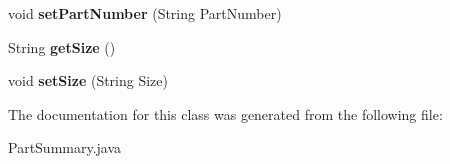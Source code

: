 \begin{DoxyCompactItemize}
\item 
void {\bfseries set\+Part\+Number} (String Part\+Number)\hypertarget{classorg_1_1jcs_1_1dss_1_1main_1_1PartSummary_a862ffbd749521c759a5122742b6de395}{}\label{classorg_1_1jcs_1_1dss_1_1main_1_1PartSummary_a862ffbd749521c759a5122742b6de395}

\item 
String {\bfseries get\+Size} ()\hypertarget{classorg_1_1jcs_1_1dss_1_1main_1_1PartSummary_ad0e537953c477eef5e63c8ae8efe1410}{}\label{classorg_1_1jcs_1_1dss_1_1main_1_1PartSummary_ad0e537953c477eef5e63c8ae8efe1410}

\item 
void {\bfseries set\+Size} (String Size)\hypertarget{classorg_1_1jcs_1_1dss_1_1main_1_1PartSummary_a5575082eb9ab00c021001414039409e7}{}\label{classorg_1_1jcs_1_1dss_1_1main_1_1PartSummary_a5575082eb9ab00c021001414039409e7}

\end{DoxyCompactItemize}


The documentation for this class was generated from the following file\+:\begin{DoxyCompactItemize}
\item 
Part\+Summary.\+java\end{DoxyCompactItemize}
